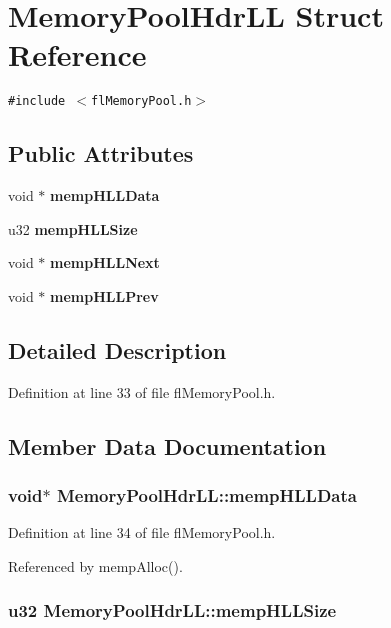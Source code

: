 \section{Memory\-Pool\-Hdr\-LL Struct Reference}
\label{structMemoryPoolHdrLL}
{\tt \#include $<$fl\-Memory\-Pool.h$>$}

\subsection*{Public Attributes}
\begin{CompactItemize}
\item 
void $\ast$ {\bf memp\-HLLData}
\item 
u32 {\bf memp\-HLLSize}
\item 
void $\ast$ {\bf memp\-HLLNext}
\item 
void $\ast$ {\bf memp\-HLLPrev}
\end{CompactItemize}


\subsection{Detailed Description}




Definition at line 33 of file fl\-Memory\-Pool.h.

\subsection{Member Data Documentation}
\subsubsection{\setlength{\rightskip}{0pt plus 5cm}void$\ast$ {\bf Memory\-Pool\-Hdr\-LL::memp\-HLLData}}\label{structMemoryPoolHdrLL_4d2d20987c196dd150d024cdfbb15dfe}




Definition at line 34 of file fl\-Memory\-Pool.h.

Referenced by memp\-Alloc().
\subsubsection{\setlength{\rightskip}{0pt plus 5cm}u32 {\bf Memory\-Pool\-Hdr\-LL::memp\-HLLSize}}\label{structMemoryPoolHdrLL_5f682711c13e963fd082a37267a0a123}





